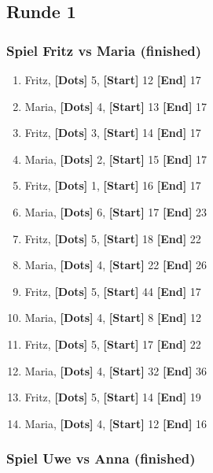 \documentclass{article}
\begin{document}
    \subsection{Runde 1}
    
    \subsubsection*{Spiel Fritz vs Maria (finished)}
    
  \begin{enumerate}
        
    \item Fritz,
      \textbf{[Dots]} 5,
      \textbf{[Start]} 12
      \textbf{[End]} 17
    \item Maria,
      \textbf{[Dots]} 4,
      \textbf{[Start]} 13
      \textbf{[End]} 17
    \item Fritz,
      \textbf{[Dots]} 3,
      \textbf{[Start]} 14
      \textbf{[End]} 17
    \item Maria,
      \textbf{[Dots]} 2,
      \textbf{[Start]} 15
      \textbf{[End]} 17
    \item Fritz,
      \textbf{[Dots]} 1,
      \textbf{[Start]} 16
      \textbf{[End]} 17
    \item Maria,
      \textbf{[Dots]} 6,
      \textbf{[Start]} 17
      \textbf{[End]} 23
    \item Fritz,
      \textbf{[Dots]} 5,
      \textbf{[Start]} 18
      \textbf{[End]} 22
    \item Maria,
      \textbf{[Dots]} 4,
      \textbf{[Start]} 22
      \textbf{[End]} 26
    \item Fritz,
      \textbf{[Dots]} 5,
      \textbf{[Start]} 44
      \textbf{[End]} 17
    \item Maria,
      \textbf{[Dots]} 4,
      \textbf{[Start]} 8
      \textbf{[End]} 12
    \item Fritz,
      \textbf{[Dots]} 5,
      \textbf{[Start]} 17
      \textbf{[End]} 22
    \item Maria,
      \textbf{[Dots]} 4,
      \textbf{[Start]} 32
      \textbf{[End]} 36
    \item Fritz,
      \textbf{[Dots]} 5,
      \textbf{[Start]} 14
      \textbf{[End]} 19
    \item Maria,
      \textbf{[Dots]} 4,
      \textbf{[Start]} 12
      \textbf{[End]} 16
  \end{enumerate}
      
    \subsubsection*{Spiel Uwe vs Anna (finished)}
    
\end{document}
